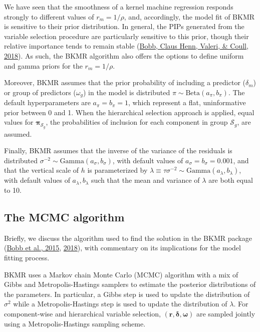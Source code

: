 \documentclass[12pt, twoside]{amherstthesis}
\begin{document}
We have seen that the smoothness of a kernel machine regression responds strongly to different values of \(r_m=1/\rho\), and, accordingly, the model fit of BKMR is sensitive to their prior distribution. In general, the PIPs generated from the variable selection procedure are particularly sensitive to this prior, though their relative importance tends to remain stable (\protect\hyperlink{ref-bobb_statistical_2018}{Bobb, Claus Henn, Valeri, \& Coull, 2018}). As such, the BKMR algorithm also offers the options to define uniform and gamma priors for the \(r_m=1/\rho\).

Moreover, BKMR assumes that the prior probability of including a predictor (\(\delta_m\)) or group of predictors (\(\omega_g\)) in the model is distributed \(\pi \sim \text{Beta}(a_\pi, b_\pi)\). The default hyperparameters are \(a_\pi=b_\pi=1\), which represent a flat, uninformative prior between 0 and 1. When the hierarchical selection approach is applied, equal values for \(\boldsymbol\pi_{\mathcal{S}_g}\), the probabilities of inclusion for each component in group \(\mathcal{S}_g\), are assumed.

Finally, BKMR assumes that the inverse of the variance of the residuals is distributed \(\sigma^{-2} \sim \text{Gamma}(a_\sigma, b_\sigma)\), with default values of \(a_\sigma=b_\sigma=0.001\), and that the vertical scale of \(h\) is parameterized by \(\lambda \equiv \tau\sigma^{-2} \sim \text{Gamma}(a_\lambda, b_\lambda)\), with default values of \(a_\lambda, b_\lambda\) such that the mean and variance of \(\lambda\) are both equal to 10.

\hypertarget{the-mcmc-algorithm}{%
\subsection{The MCMC algorithm}\label{the-mcmc-algorithm}}

Briefly, we discuss the algorithm used to find the solution in the BKMR package (\protect\hyperlink{ref-bobb_bayesian_2015}{Bobb et al., 2015}, \protect\hyperlink{ref-bobb_statistical_2018}{2018}), with commentary on its implications for the model fitting process.

BKMR uses a Markov chain Monte Carlo (MCMC) algorithm with a mix of Gibbs and Metropolis-Hastings samplers to estimate the posterior distributions of the parameters. In particular, a Gibbs step is used to update the distribution of \(\sigma^2\) while a Metropolis-Hastings step is used to update the distribution of \(\lambda\). For component-wise and hierarchical variable selection, \((\textbf{r}, \boldsymbol\delta, \boldsymbol\omega)\) are sampled jointly using a Metropolis-Hastings sampling scheme.
\end{document}
